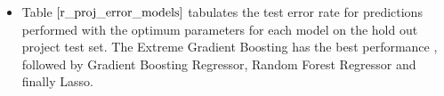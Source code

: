 \documentclass[twoside,12pt]{article}
\begin{document}
\begin{itemize}
\FloatBarrier
\item
Table $\eqref{r_proj_error_models}$ tabulates the test error rate for predictions performed with the optimum parameters for each model on the hold out project test set. The Extreme Gradient Boosting has the best performance , followed by Gradient Boosting Regressor, Random Forest Regressor and finally Lasso.
\begin{table}[h]
\centering
{}
	\caption[]{Test Error Rate for the models on the Project hold out test set}
	\label{r_proj_error_models}
\end{table}
\end{itemize}

\FloatBarrier
\end{document}

